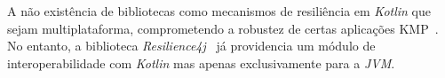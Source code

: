 A não existência de bibliotecas como mecanismos de resiliência em \textit{Kotlin} que sejam multiplataforma, comprometendo a robustez de certas aplicações KMP~\cite{kmp}. No entanto, a biblioteca \textit{Resilience4j}~\cite{resilience4j} já providencia um módulo de interoperabilidade com \textit{Kotlin} mas apenas exclusivamente para a \textit{JVM}.
